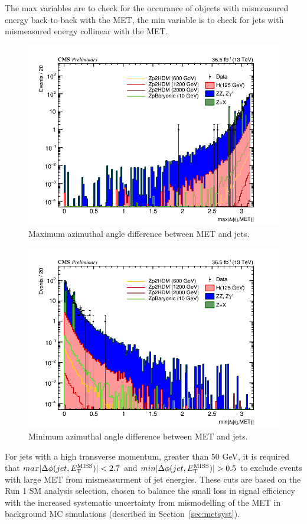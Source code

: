 The max variables are to check for the occurance of objects with mismeasured energy back-to-back with the MET, the min variable is to check for jets with mismeasured energy collinear with the MET.

\begin{figure}[tbh]
\centering
\includegraphics[width=5in]{figures/hist_hDPHI_MAX_JET_MET_8.png}
\caption{Maximum azimuthal angle difference between MET and jets.}
\label{fig:maxdeltaphijmet}
\end{figure}

\begin{figure}[tbh]
\centering
\includegraphics[width=5in]{figures/hist_hDPHI_MIN_JET_MET_8.png}
\caption{Minimum azimuthal angle difference between MET and jets.}
\label{fig:mindeltaphijmet}
\end{figure}

For jets with a high transverse momentum, greater than 50 GeV, it is required that $max|\Delta\phi(jet, E_{\rm{T}}^{\rm{MISS}})|<2.7$ and $min|\Delta\phi(jet, E_{\rm{T}}^{\rm{MISS}})|>0.5$ to exclude events with large MET from mismeasurment of jet energies. These cuts are based on the Run 1 SM analysis selection, chosen to balance the small loss in signal efficiency with the increased systematic uncertainty from mismodelling of the MET in background MC simulations (described in Section~\ref{sec:metsyst}).

